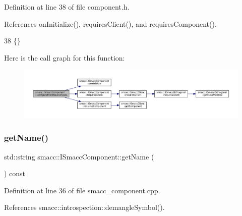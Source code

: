 Definition at line 38 of file component.\+h.



References on\+Initialize(), requires\+Client(), and requires\+Component().


\begin{DoxyCode}
38 \{\}
\end{DoxyCode}
Here is the call graph for this function\+:
\nopagebreak
\begin{figure}[H]
\begin{center}
\leavevmode
\includegraphics[width=350pt]{classsmacc_1_1ISmaccComponent_ad1c9ede43be1f83c10c6e7a2e14db8d3_cgraph}
\end{center}
\end{figure}
\mbox{\label{classsmacc_1_1ISmaccComponent_a8bfa94b1b1c616d55837ebba1b426c6e}} 
\subsubsection{\texorpdfstring{get\+Name()}{getName()}}
{\footnotesize\ttfamily std\+::string smacc\+::\+I\+Smacc\+Component\+::get\+Name (\begin{DoxyParamCaption}{ }\end{DoxyParamCaption}) const\hspace{0.3cm}{\ttfamily [virtual]}}



Definition at line 36 of file smacc\+\_\+component.\+cpp.



References smacc\+::introspection\+::demangle\+Symbol().


